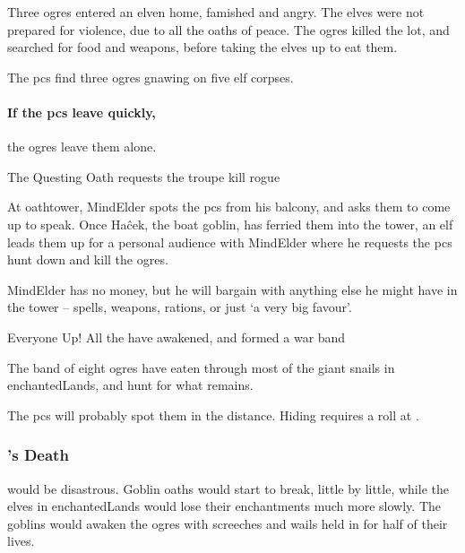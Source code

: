 \begin{multicols}{2}
\begin{exampletext}
  Three \glspl{ogre} entered an elven home, famished and angry.
  The elves were not prepared for violence, due to all the oaths of peace.
  The \glspl{ogre} killed the lot, and searched for food and \glspl{weapon}, before taking the elves up to eat them.
\end{exampletext}

The \glspl{pc} find three \glspl{ogre} gnawing on five elf corpses.


\paragraph{If the \glspl{pc} leave quickly,}
the \glspl{ogre} leave them alone.

{The Questing Oath}%
{ requests the troupe kill rogue }%

At \gls{oathtower}, \gls{MindElder} spots the \glspl{pc} from his balcony, and asks them to come up to speak.
Once Ha\^{c}ek, the boat goblin, has ferried them into the tower, an elf leads them up for a personal audience with \gls{MindElder} where he requests the \glspl{pc} hunt down and kill the \glspl{ogre}.

\Gls{MindElder} has no money, but he will bargain with anything else he might have in the tower -- \glspl{spell}, \glspl{weapon}, \glspl{ration}, or just `a very big favour'.

{Everyone Up!}%
{All the  have awakened, and formed a war band}%

The band of eight \glspl{ogre} have eaten through most of the giant snails in \gls{enchantedLands}, and hunt for what remains.



The \glspl{pc} will probably spot them in the distance.
Hiding requires a  roll at
\tn.

\label{lastOgreSegment}

\stopcontents[segments]

\subsubsection{'s Death}
would be disastrous.
Goblin oaths would start to break, little by little, while the elves in \gls{enchantedLands} would lose their enchantments much more slowly.
The goblins would awaken the \glspl{ogre} with screeches and wails held in for half of their lives.


\end{multicols}
